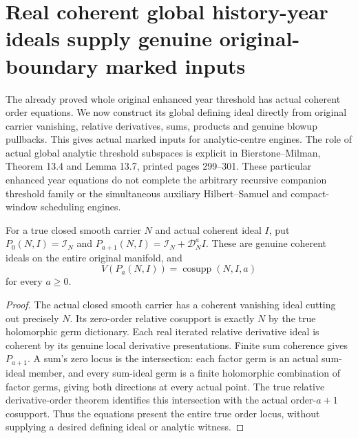 \section{Real coherent global history-year ideals supply genuine original-boundary marked inputs}

The already proved whole original enhanced year threshold has actual coherent
order equations. We now construct its global defining ideal directly from
original carrier vanishing, relative derivatives, sums, products and genuine
blowup pullbacks. This gives actual marked inputs for analytic-centre engines.
The role of actual global analytic threshold subspaces is explicit in
Bierstone--Milman\cite{bierstone-milman97-invent-math}, Theorem 13.4 and
Lemma 13.7, printed pages 299--301. These particular enhanced year equations
do not complete the arbitrary recursive companion threshold family or the
simultaneous auxiliary Hilbert--Samuel and compact-window scheduling engines.

\begin{theorem}
\label{hir:original-global-order-coherent-defining-ideal}
\leanok
{}
For a true closed smooth carrier $N$ and actual coherent ideal $I$, put
$P_0(N,I)=\mathcal I_N$ and
$P_{a+1}(N,I)=\mathcal I_N+\mathcal D_N^a I$.
These are genuine coherent ideals on the entire original manifold, and
\[
 V(P_a(N,I))=\operatorname{cosupp}(N,I,a)
\]
for every $a\geq0$.
\end{theorem}
\begin{proof}
The actual closed smooth carrier has a coherent vanishing ideal cutting out
precisely $N$. Its zero-order relative cosupport is exactly $N$ by the true
holomorphic germ dictionary. Each real iterated relative derivative ideal is
coherent by its genuine local derivative presentations. Finite sum coherence
gives $P_{a+1}$. A sum's zero locus is the intersection: each factor germ is
an actual sum-ideal member, and every sum-ideal germ is a finite holomorphic
combination of factor germs, giving both directions at every actual point.
The true relative derivative-order theorem identifies this intersection with
the actual order-$a+1$ cosupport. Thus the equations present the entire true
order locus, without supplying a desired defining ideal or analytic witness.
\end{proof}

